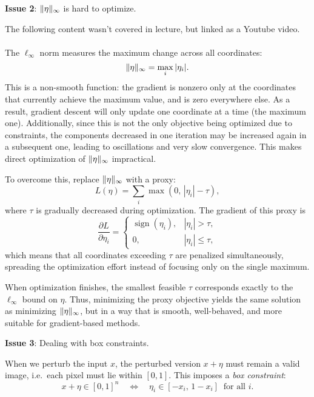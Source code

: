 \documentclass[11pt]{article}
\begin{document}
\textbf{Issue 2}: $\lVert \eta \rVert_\infty$ is hard to optimize. 
\begin{note}
The following content wasn't covered in lecture, but linked as a Youtube video. \\ \\
The $\ell_\infty$ norm measures the maximum change across all coordinates:
\[
\lVert \eta \rVert_\infty = \max_i |\eta_i|.
\]
This is a non-smooth function: the gradient is nonzero only at the coordinates that currently achieve the maximum value, and is zero everywhere else. As a result, gradient descent will only update one coordinate at a time (the maximum one). Additionally, since this is not the only objective being optimized due to constraints, the components decreased in one iteration may be increased again in a subsequent one, leading to oscillations and very slow convergence. This makes direct optimization of $\lVert \eta \rVert_\infty$ impractical. 

To overcome this, replace $\lVert \eta \rVert_\infty$ with a proxy:
\[
L(\eta) = \sum_i \max(0,\, |\eta_i| - \tau),
\]
where $\tau$ is gradually decreased during optimization. The gradient of this proxy is
\[
\frac{\partial L}{\partial \eta_i} =
\begin{cases}
\operatorname{sign}(\eta_i), & |\eta_i| > \tau, \\
0, & |\eta_i| \leq \tau,
\end{cases}
\]
which means that all coordinates exceeding $\tau$ are penalized simultaneously, spreading the optimization effort instead of focusing only on the single maximum.

When optimization finishes, the smallest feasible $\tau$ corresponds exactly to the $\ell_\infty$ bound on $\eta$. Thus, minimizing the proxy objective yields the same solution as minimizing $\lVert \eta \rVert_\infty$, but in a way that is smooth, well-behaved, and more suitable for gradient-based methods.
\end{note}

\textbf{Issue 3}: Dealing with box constraints.  

When we perturb the input $x$, the perturbed version $x+\eta$ must remain a valid image, i.e.\ each pixel must lie within $[0,1]$. This imposes a \emph{box constraint}:
\[
x+\eta \in [0,1]^n \quad \Longleftrightarrow \quad \eta_i \in [-x_i,\, 1-x_i] \;\; \text{for all } i.
\]
\end{document}
